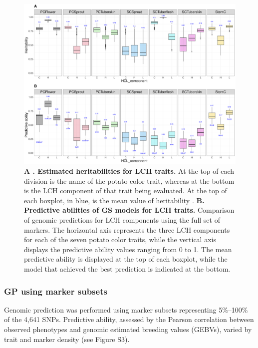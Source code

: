 \documentclass[pdflatex,sn-mathphys-ay]{sn-jnl}%
\begin{document}
\begin{figure}[H]
\begin{centering}
\includegraphics[width=15cm]{Figures/ColorPapa_H_PA_boxplots.v2.pdf}
\par\end{centering}
\caption{\textbf{A . Estimated heritabilities for LCH traits.} At the top of each division is the name of the potato color trait, whereas at the bottom is the LCH component of that trait being evaluated. At the top of each boxplot, in blue, is the mean value of heritability \label{fig:Heritabilities}. \textbf{B. Predictive abilities of GS models for LCH traits.} Comparison of genomic predictions for LCH components using the full set of markers.  The horizontal axis represents the three LCH components for each of the seven potato color traits, while the vertical axis displays the predictive ability values ranging from 0 to 1. The mean predictive ability is displayed at the top of each boxplot, while the model that achieved the best prediction is indicated at the bottom.}
\end{figure}

\subsubsection{GP using marker subsets}

Genomic prediction was performed using marker subsets representing 5\%–100\% of the 4,641 SNPs. Predictive ability, assessed by the Pearson correlation between observed phenotypes and genomic estimated breeding values (GEBVs), varied by trait and marker density (see Figure S3).
\end{document}
